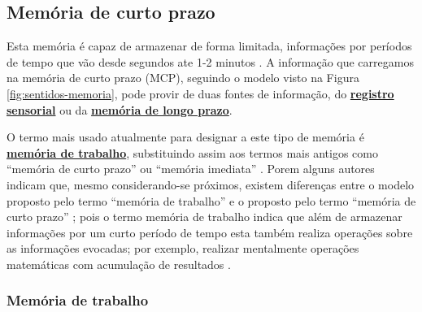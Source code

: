 \subsection{Memória de curto prazo } 
\label{sec:memoria:curto}



Esta memória é capaz de armazenar de forma limitada, 
informações por períodos de tempo que vão desde segundos ate 1-2 minutos
\cite[pp. 678]{spreen2006compendium} \cite[pp. 158]{sternbergpsicologia}.
A informação que carregamos na memória de curto prazo (MCP),
seguindo o modelo visto na Figura \ref{fig:sentidos-memoria},  
pode provir de duas fontes de informação, do \hyperref[fig:sentidos-memoria]{\textbf{registro sensorial}} 
ou da \hyperref[sec:memoria:longo]{\textbf{memória de longo prazo}}.


O termo mais usado atualmente para designar a este tipo de memória é 
\hyperref[subsubsec:memoriatrabalho]{\textbf{memória de trabalho}},
substituindo assim aos termos mais antigos como ``memória de curto prazo'' ou ``memória imediata''
\cite[pp. 678]{spreen2006compendium}.
Porem alguns autores indicam  que, mesmo considerando-se próximos, 
existem diferenças entre o modelo proposto pelo termo 
``memória de trabalho'' e o proposto pelo termo ``memória de curto prazo'' 
\cite[pp. 266, 267, 269]{braisby2012cognitive};
pois o termo memória de trabalho indica que além de armazenar informações por um curto período de tempo
esta também realiza operações sobre as informações evocadas; 
por exemplo, realizar mentalmente operações matemáticas com acumulação de resultados 
\cite[pp. 267, 272]{braisby2012cognitive}.


\subsubsection{Memória de trabalho} 
\label{subsubsec:memoriatrabalho}

